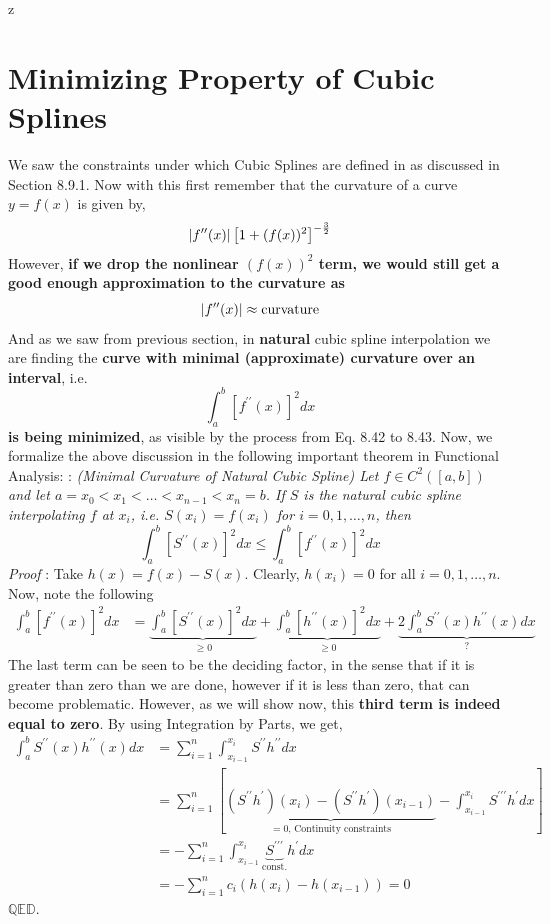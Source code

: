 z\documentclass[a4paper,12pt,twoside]{book}
\newcommand{\nll}[0]{\newline\newline}
\newcommand{\tit}[1]{\textit{#1}}
\newcommand{\theor}[1]{\boxed{\textbf{\textit{Theorem \thechapter.#1}}}}
\DeclarePairedDelimiter\abs{\lvert}{\rvert}
\begin{document}
\section{Minimizing Property of Cubic Splines}
We saw the constraints under which Cubic Splines are defined in as discussed in Section 8.9.1. Now with this first remember that the curvature of a curve $y=f(x)$ is given by,
\[ \abs*{f^{\prime\prime}(x)}\left[1+(f(x))^2\right]^{-\frac{3}{2}}\]
However, \textbf{if we drop the nonlinear $(f(x))^2$ term, we would still get a good enough approximation to the curvature as}
\[\abs*{f^{\prime\prime}(x)} \approx \text{curvature}\]
And as we saw from previous section, in \textbf{natural} cubic spline interpolation we are finding the \textbf{curve with minimal (approximate) curvature over an interval}, i.e.
\[ \int_a^b \left[ f^{\prime\prime}(x)\right]^2 dx \]
\textbf{is being minimized}, as visible by the process from Eq. 8.42 to 8.43.
\nll
Now, we formalize the above discussion in the following important theorem in Functional Analysis:
\nll
\theor{11}  : \tit{(Minimal Curvature of Natural Cubic Spline) Let $f\in C^2([a,b])$ and let $a = x_0 < x_1 < \dots < x_{n-1}< x_n = b$. If $S$ is the natural cubic spline interpolating $f$ at $x_i$, i.e. $S(x_i) = f(x_i)$ for $i=0,1,\dots,n$, then
\[\int_a^b \left[ S^{\prime\prime}(x) \right]^2 dx \le \int_a^b \left[ f^{\prime\prime}(x) \right]^2 dx\]
}
\nll
\tit{Proof} : Take $h(x) = f(x) - S(x)$. Clearly, $h(x_i) = 0$ for all $i=0,1,\dots,n$. Now, note the following
\begin{equation*}
    \begin{split}
        \int_a^b \left[ f^{\prime\prime}(x) \right]^2 dx &= \underbrace{\int_a^b \left[S^{\prime\prime}(x)\right]^2 dx}_{\ge 0} + \underbrace{\int_a^b \left[ h^{\prime\prime}(x) \right]^2dx}_{\ge 0} + \underbrace{2\int_a^bS^{\prime\prime}(x) h^{\prime\prime}(x) dx}_{?}
    \end{split}
\end{equation*}
The last term can be seen to be the deciding factor, in the sense that if it is greater than zero than we are done, however if it is less than zero, that can become problematic. 
\nll
However, as we will show now, this \textbf{third term is indeed equal to zero}. By using Integration by Parts, we get,
\begin{equation}
    \begin{split}
        \int_a^b S^{\prime\prime} (x) h^{\prime\prime}(x) dx &= \sum_{i=1}^n \int_{x_{i-1}}^{x_i} S^{\prime\prime} h^{\prime\prime} dx\\
        &= \sum_{i=1}^n \left[ \underbrace{(S^{\prime\prime}h^{\prime})(x_i) - (S^{\prime\prime}h^\prime)(x_{i-1})}_{ = 0 \text{, Continuity constraints}} - \int_{x_{i-1}}^{x_i} S^{\prime\prime\prime} h^{\prime} dx \right]\\
        &= - \sum_{i=1}^n \int_{x_{i-1}}^{x_i} \underbrace{S^{\prime\prime\prime}}_{\text{const.}} h^{\prime} dx\\
        &= -\sum_{i=1}^n c_i (h(x_i) - h(x_{i-1})) = 0
    \end{split}
\end{equation}
$\mathbb{QED}$.
\end{document}
